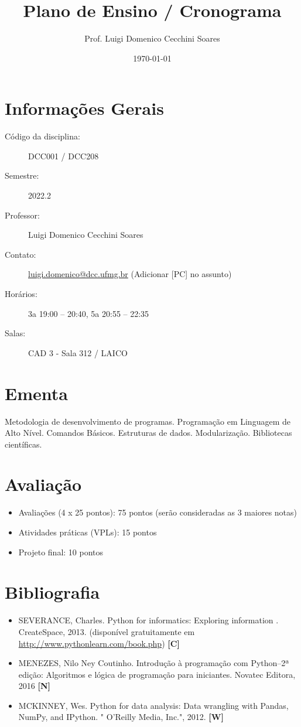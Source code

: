 \documentclass[a4paper, 11pt]{article}
\title{Plano de Ensino / Cronograma}
\author{Prof. Luigi Domenico Cecchini Soares}
\date{\today}
\title{}
\makeatletter
\let\thetitle\@title{}
\makeatother
\begin{document}
\begin{center}
\Large\bfseries\thetitle
\end{center}

\section{Informações Gerais}
\label{sec:orga5c4b6d}

\begin{description}
\item[{Código da disciplina:}] DCC001 / DCC208
\item[{Semestre:}] 2022.2
\item[{Professor:}] Luigi Domenico Cecchini Soares
\item[{Contato:}] \href{mailto:luigi.domenico@dcc.ufmg.br}{luigi.domenico@dcc.ufmg.br} (Adicionar [PC] no assunto)
\item[{Horários:}] 3a 19:00 -- 20:40, 5a 20:55 -- 22:35
\item[{Salas:}] CAD 3 - Sala 312 / LAICO
\end{description}

\section{Ementa}
\label{sec:orgefe93e4}
Metodologia de desenvolvimento de programas. Programação em Linguagem de
Alto Nível. Comandos Básicos. Estruturas de dados. Modularização. Bibliotecas
científicas.

\section{Avaliação}
\label{sec:org022fc4a}

\begin{itemize}
\item Avaliações (4 x 25 pontos): 75 pontos (serão consideradas as 3 maiores notas)
\item Atividades práticas (VPLs): 15 pontos
\item Projeto final: 10 pontos
\end{itemize}

\section{Bibliografia}
\label{sec:org766d6f3}

\begin{itemize}
\item SEVERANCE, Charles. Python for informatics: Exploring information .
CreateSpace, 2013. (disponível gratuitamente em \url{http://www.pythonlearn.com/book.php}) \textbf{[C]}
\item MENEZES, Nilo Ney Coutinho. Introdução à programação com Python–2ª edição:
Algoritmos e lógica de programação para iniciantes. Novatec Editora, 2016 \textbf{[N]}
\item MCKINNEY, Wes. Python for data analysis: Data wrangling with Pandas, NumPy,
and IPython. " O'Reilly Media, Inc.", 2012. \textbf{[W]}
\end{itemize}
\end{document}
